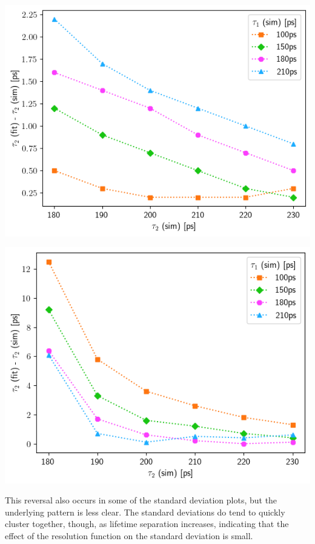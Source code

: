 \begin{minipage}{.45\linewidth}
    \includegraphics[width=.9\linewidth]{Batch 3/single Gaussian IRF/t2-diff 2080.png}
    \label{fig:irf-reverse2080}
\end{minipage}
\hfill
\begin{minipage}{.45\linewidth}
    \includegraphics[width=.9\linewidth]{Batch 3/single Gaussian IRF/t2-diff 8020.png}
    \label{fig:irf-reverse8020}
\end{minipage}

 

This reversal also occurs in some of the standard deviation plots, but the underlying pattern is less clear. The standard deviations do tend to quickly cluster together, though, as lifetime separation increases, indicating that the effect of the resolution function on the standard deviation is small.

